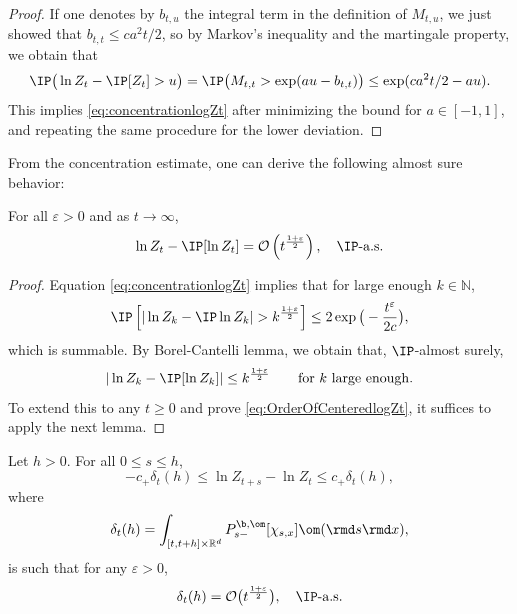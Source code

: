 \begin{proof}
If one denotes by $b_{t,u}$ the integral term in the definition of $M_{t,u}$, we just showed that $b_{t,t} \leq c a^2t/2$, so by Markov's inequality and the martingale property, we obtain that
\begin{equation}
\IP\big(\ln Z_t - \IP[Z_t] > u\big) = \IP\big(M_{t,t} > \exp(au-b_{t,t})\big)
\leq \exp(c a^2t/2 - au).
\end{equation}
This implies \eqref{eq:concentrationlogZt} after minimizing the bound for $a\in[-1,1]$, and repeating the same procedure for the lower deviation.
\end{proof}

From the concentration estimate, one can derive the following almost sure behavior:
\begin{corollary} \label{cor:var1}
For all $\varepsilon>0$ and as $t\to \infty$,
\begin{equation} \label{eq:OrderOfCenteredlogZt}
\ln Z_t - \IP[\ln Z_t] = \mathcal{O}\left(t^{\frac{1+\varepsilon}{2}}\right), \quad \IP\text{-a.s.} 
\end{equation}
\end{corollary}
\begin{proof}
Equation \eqref{eq:concentrationlogZt} implies that for large enough $k\in\mathbb{N}$,
\begin{equation}
\IP\left[|\ln Z_k - \IP \ln Z_k|> k^{\frac{1+\varepsilon}{2}}\right] \leq 2\exp\big(-\frac{t^{\varepsilon}}{2c}\big),
\end{equation}
which is summable. By Borel-Cantelli lemma, we obtain that,  $\IP$-almost surely,
$$|\ln Z_k - \IP[\ln Z_k]| \leq k^{\frac{1+\varepsilon}{2}}\qquad {\rm for\ } k {\rm \ large\ enough.}
$$ 
To extend this to any $t\geq 0$ and prove \eqref{eq:OrderOfCenteredlogZt}, it suffices to apply the next lemma.
\end{proof}
\begin{lemma} Let $h>0$. For all $0\leq s \leq h$,
\begin{equation} \label{eq:BoundOnZt+s-Zt}
-c_+ \delta_t(h) \leq \ln Z_{t+s} - \ln Z_t \leq c_+\delta_t(h),
\end{equation}
where
\[\delta_t(h)=\int_{[t,t+h]\times\mathbb{R}^d} P_{s-}^{\b,\om}[\chi_{s,x}] \om(\rmd s \rmd x),\]
is such that for any $\varepsilon > 0$,
\begin{equation}\label{eq:deltah}\delta_t(h)=\mathcal{O}\big(t^{\frac{1+\varepsilon}{2}}\big), \quad \IP\text{-a.s.}\end{equation}
\end{lemma}
